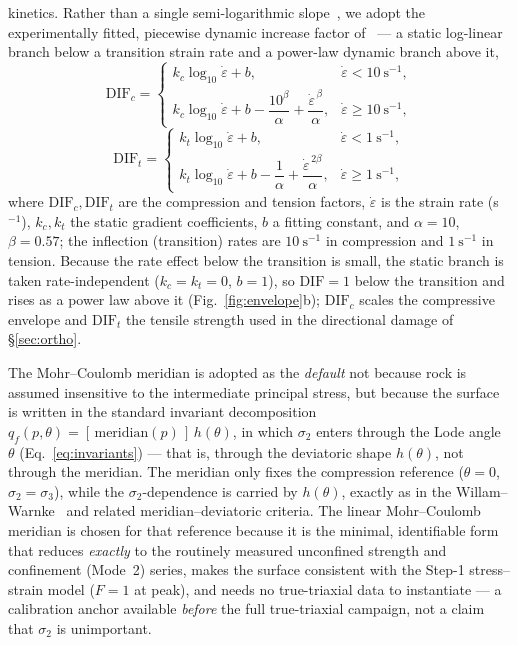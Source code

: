 \documentclass[11pt]{article}
\begin{document}
kinetics. Rather than a single semi-logarithmic slope~\citep{zhao2000}, we adopt
the experimentally fitted, piecewise dynamic increase factor
of~\citet{ZHU2024105948} --- a static log-linear branch below a transition strain
rate and a power-law dynamic branch above it,
\begin{equation}
\mathrm{DIF}_c=
\begin{cases}
k_c\log_{10}\dot\varepsilon+b, & \dot\varepsilon<10~\mathrm{s^{-1}},\\[3pt]
k_c\log_{10}\dot\varepsilon+b-\dfrac{10^{\beta}}{\alpha}+\dfrac{\dot\varepsilon^{\,\beta}}{\alpha}, & \dot\varepsilon\ge10~\mathrm{s^{-1}},
\end{cases}
\label{eq:difc}
\end{equation}
\begin{equation}
\mathrm{DIF}_t=
\begin{cases}
k_t\log_{10}\dot\varepsilon+b, & \dot\varepsilon<1~\mathrm{s^{-1}},\\[3pt]
k_t\log_{10}\dot\varepsilon+b-\dfrac{1}{\alpha}+\dfrac{\dot\varepsilon^{\,2\beta}}{\alpha}, & \dot\varepsilon\ge1~\mathrm{s^{-1}},
\end{cases}
\label{eq:dift}
\end{equation}
where $\mathrm{DIF}_c,\mathrm{DIF}_t$ are the compression and tension factors,
$\dot\varepsilon$ is the strain rate (s$^{-1}$), $k_c,k_t$ the static gradient
coefficients, $b$ a fitting constant, and $\alpha=10$, $\beta=0.57$; the
inflection (transition) rates are $10~\mathrm{s^{-1}}$ in compression and
$1~\mathrm{s^{-1}}$ in tension. Because the rate effect below the transition is
small, the static branch is taken rate-independent ($k_c=k_t=0$, $b=1$), so
$\mathrm{DIF}=1$ below the transition and rises as a power law above it
(Fig.~\ref{fig:envelope}b); $\mathrm{DIF}_c$ scales the compressive envelope and
$\mathrm{DIF}_t$ the tensile strength used in the directional damage of
\S\ref{sec:ortho}.

The Mohr--Coulomb meridian is adopted as the \emph{default} not because rock is
assumed insensitive to the intermediate principal stress, but because the surface
is written in the standard invariant decomposition
$q_f(p,\theta)=[\,\text{meridian}(p)\,]\,h(\theta)$, in which $\sigma_2$ enters
through the Lode angle $\theta$ (Eq.~\eqref{eq:invariants}) --- that is, through the
deviatoric shape $h(\theta)$, not through the meridian. The meridian only fixes the
compression reference ($\theta=0$, $\sigma_2=\sigma_3$), while the
$\sigma_2$-dependence is carried by $h(\theta)$, exactly as in the
Willam--Warnke~\citep{willam1975} and related meridian--deviatoric criteria. The
linear Mohr--Coulomb meridian is chosen for that reference because it is the
minimal, identifiable form that reduces \emph{exactly} to the routinely measured
unconfined strength and confinement (Mode~2) series, makes the surface consistent
with the Step-1 stress--strain model ($F=1$ at peak), and needs no true-triaxial
data to instantiate --- a calibration anchor available \emph{before} the full
true-triaxial campaign, not a claim that $\sigma_2$ is unimportant.
\end{document}
